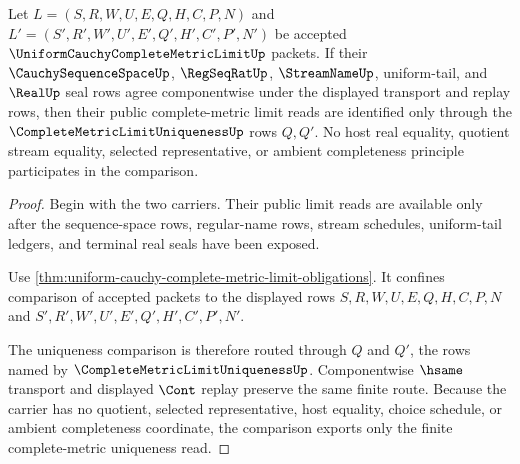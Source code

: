 \begin{theorem}
\label{thm:uniform-cauchy-complete-metric-limit-uniqueness}
Let $L=(S,R,W,U,E,Q,H,C,P,N)$ and $L'=(S',R',W',U',E',Q',H',C',P',N')$ be accepted $\UniformCauchyCompleteMetricLimitUp$ packets. If their $\CauchySequenceSpaceUp$, $\RegSeqRatUp$, $\StreamNameUp$, uniform-tail, and $\RealUp$ seal rows agree componentwise under the displayed transport and replay rows, then their public complete-metric limit reads are identified only through the $\CompleteMetricLimitUniquenessUp$ rows $Q,Q'$. No host real equality, quotient stream equality, selected representative, or ambient completeness principle participates in the comparison.
\end{theorem}
\begin{proof}
Begin with the two carriers. Their public limit reads are available only after the sequence-space rows, regular-name rows, stream schedules, uniform-tail ledgers, and terminal real seals have been exposed.

Use \autoref{thm:uniform-cauchy-complete-metric-limit-obligations}. It confines comparison of accepted packets to the displayed rows $S,R,W,U,E,Q,H,C,P,N$ and $S',R',W',U',E',Q',H',C',P',N'$.

The uniqueness comparison is therefore routed through $Q$ and $Q'$, the rows named by $\CompleteMetricLimitUniquenessUp$. Componentwise $\hsame$ transport and displayed $\Cont$ replay preserve the same finite route. Because the carrier has no quotient, selected representative, host equality, choice schedule, or ambient completeness coordinate, the comparison exports only the finite complete-metric uniqueness read.
\end{proof}



